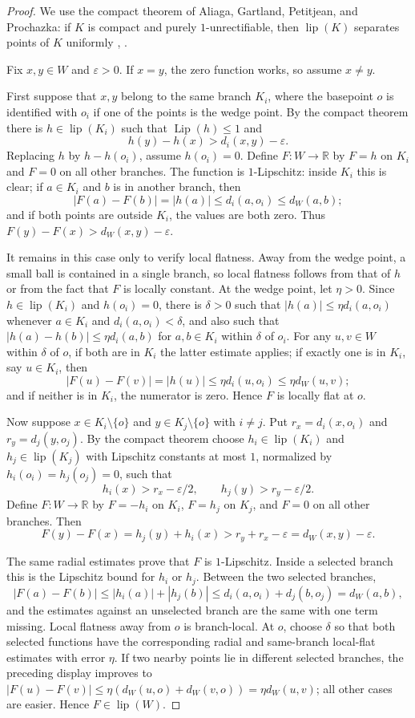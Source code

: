 \documentclass[11pt]{amsart}
\newcommand{\lip}{\operatorname{lip}}
\newcommand{\Lip}{\operatorname{Lip}}
\newcommand{\eps}{\varepsilon}
\newcommand{\R}{\mathbb{R}}
\begin{document}
\begin{proof}
We use the compact theorem of Aliaga, Gartland, Petitjean, and Prochazka:
if $K$ is compact and purely $1$-unrectifiable, then $\lip(K)$ separates
points of $K$ uniformly \cite[Theorem 2.10]{Aliaga2606},
\cite[Theorem A]{AGPP}.

Fix $x,y\in W$ and $\eps>0$.  If $x=y$, the zero function works, so assume
$x\neq y$.

First suppose that $x,y$ belong to the same branch $K_i$, where the basepoint
$o$ is identified with $o_i$ if one of the points is the wedge point.  By the
compact theorem there is $h\in\lip(K_i)$ such that $\Lip(h)\leq 1$ and
\[
  h(y)-h(x)>d_i(x,y)-\eps .
\]
Replacing $h$ by $h-h(o_i)$, assume $h(o_i)=0$.  Define $F:W\to\R$ by
$F=h$ on $K_i$ and $F=0$ on all other branches.  The function is
$1$-Lipschitz: inside $K_i$ this is clear; if $a\in K_i$ and $b$ is in another
branch, then
\[
  |F(a)-F(b)|=|h(a)|\leq d_i(a,o_i)\leq d_W(a,b);
\]
and if both points are outside $K_i$, the values are both zero.  Thus
$F(y)-F(x)>d_W(x,y)-\eps$.

It remains in this case only to verify local flatness.  Away from the wedge
point, a small ball is contained in a single branch, so local flatness follows
from that of $h$ or from the fact that $F$ is locally constant.  At the wedge
point, let $\eta>0$.  Since $h\in\lip(K_i)$ and $h(o_i)=0$, there is
$\delta>0$ such that $|h(a)|\leq\eta d_i(a,o_i)$ whenever
$a\in K_i$ and $d_i(a,o_i)<\delta$, and also such that
$|h(a)-h(b)|\leq\eta d_i(a,b)$ for $a,b\in K_i$ within $\delta$ of $o_i$.
For any $u,v\in W$ within $\delta$ of $o$, if both are in $K_i$ the latter
estimate applies; if exactly one is in $K_i$, say $u\in K_i$, then
\[
  |F(u)-F(v)|=|h(u)|\leq \eta d_i(u,o_i)\leq \eta d_W(u,v);
\]
and if neither is in $K_i$, the numerator is zero.  Hence $F$ is locally flat
at $o$.

Now suppose $x\in K_i\setminus\{o\}$ and $y\in K_j\setminus\{o\}$ with
$i\neq j$.  Put $r_x=d_i(x,o_i)$ and $r_y=d_j(y,o_j)$.  By the compact theorem
choose $h_i\in\lip(K_i)$ and $h_j\in\lip(K_j)$ with Lipschitz constants at
most $1$, normalized by $h_i(o_i)=h_j(o_j)=0$, such that
\[
  h_i(x)>r_x-\eps/2,
  \qquad
  h_j(y)>r_y-\eps/2 .
\]
Define $F:W\to\R$ by $F=-h_i$ on $K_i$, $F=h_j$ on $K_j$, and $F=0$ on all
other branches.  Then
\[
  F(y)-F(x)=h_j(y)+h_i(x)>r_y+r_x-\eps=d_W(x,y)-\eps .
\]

The same radial estimates prove that $F$ is $1$-Lipschitz.  Inside a selected
branch this is the Lipschitz bound for $h_i$ or $h_j$.  Between the two
selected branches,
\[
  |F(a)-F(b)|
  \leq |h_i(a)|+|h_j(b)|
  \leq d_i(a,o_i)+d_j(b,o_j)=d_W(a,b),
\]
and the estimates against an unselected branch are the same with one term
missing.  Local flatness away from $o$ is branch-local.  At $o$, choose
$\delta$ so that both selected functions have the corresponding radial and
same-branch local-flat estimates with error $\eta$.  If two nearby points lie
in different selected branches, the preceding display improves to
$|F(u)-F(v)|\leq \eta(d_W(u,o)+d_W(v,o))=\eta d_W(u,v)$; all other cases are
easier.  Hence $F\in\lip(W)$.


\end{proof}
\end{document}
